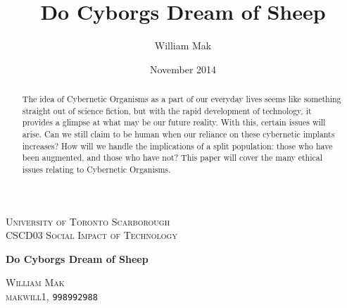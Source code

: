 \documentclass[12pt,a4paper,notitlepage]{article}
\title{Do Cyborgs Dream of Sheep}
\author{William Mak}
\date{November 2014}
\begin{document}
\begin{titlepage}
	\newcommand{\HRule}{\rule{\linewidth}{0.5mm}}

	\begin{center}
		\textsc{\LARGE University of Toronto Scarborough}\\[0.4cm]
		\textsc{\Large CSCD03 \textendash{} Social Impact of Technology}\\[0.4cm]
		\vspace*{\fill}

		{\huge \bfseries Do Cyborgs Dream of Sheep}\\[1cm]

		\begin{minipage}{0.5\textwidth}
			\begin{flushleft}
			\end{flushleft}
		\end{minipage}
		\begin{minipage}{0.4\textwidth}
			\linespread{1.5}
			\textsc{William Mak}\\
			\textsc{makwill1}, \texttt{998992988} \\
		\end{minipage}
		\vfill
	\end{center}
\end{titlepage}

\maketitle
\begin{abstract}
The idea of Cybernetic Organisms as a part of our everyday lives seems like
something straight out of science fiction, but with the rapid development of
technology, it provides a glimpse at what may be our future reality. With this,
certain issues will arise. Can we still claim to be human when our reliance on
these cybernetic implants increases? How will we handle the implications of a
split population: those who have been augmented, and those who have not? This
paper will cover the many ethical issues relating to Cybernetic Organisms.
\end{abstract}
\end{document}
